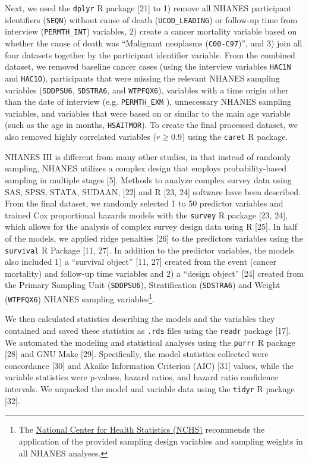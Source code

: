 \documentclass[12pt,oneside]{reedthesis}
\theoremstyle{definition}
\theoremstyle{definition}
\theoremstyle{definition}
\theoremstyle{remark}
\begin{document}
Next, we used the \texttt{dplyr} R package {[}21{]} to 1) remove all
NHANES participant identifiers (\texttt{SEQN}) without cause of death
(\texttt{UCOD\_LEADING}) or follow-up time from interview
(\texttt{PERMTH\_INT}) variables, 2) create a cancer mortality variable
based on whether the cause of death was ``Malignant neoplasms
(\texttt{C00-C97})'', and 3) join all four datasets together by the
participant identifier variable. From the combined dataset, we removed
baseline cancer cases (using the interview variables \texttt{HAC1N} and
\texttt{HAC1O}), participants that were missing the relevant NHANES
sampling variables (\texttt{SDDPSU6}, \texttt{SDSTRA6}, and
\texttt{WTPFQX6}), variables with a time origin other than the date of
interview (e.g. \texttt{PERMTH\_EXM} ), unnecessary NHANES sampling
variables, and variables that were based on or similar to the main age
variable (such as the age in months, \texttt{HSAITMOR}). To create the
final processed dataset, we also removed highly correlated variables
(\(r \geq 0.9\)) using the \texttt{caret} R package.

NHANES III is different from many other studies, in that instead of
randomly sampling, NHANES utilizes a complex design that employs
probability-based sampling in multiple stages {[}5{]}. Methods to
analyze complex survey data using SAS, SPSS, STATA, SUDAAN, {[}22{]} and
R {[}23, 24{]} software have been described. From the final dataset, we
randomly selected 1 to 50 predictor variables and trained Cox
proportional hazards models with the \texttt{survey} R package {[}23,
24{]}, which allows for the analysis of complex survey design data using
R {[}25{]}. In half of the models, we applied ridge penalties {[}26{]}
to the predictors variables using the \texttt{survival} R Package {[}11,
27{]}. In addition to the predictor variables, the models also included
1) a ``survival object'' {[}11, 27{]} created from the event (cancer
mortality) and follow-up time variables and 2) a ``design object''
{[}24{]} created from the Primary Sampling Unit (\texttt{SDDPSU6}),
Stratification (\texttt{SDSTRA6}) and Weight (\texttt{WTPFQX6}) NHANES
sampling variables\footnote{The
  \href{https://www.cdc.gov/nchs/tutorials/NHANES/SurveyDesign/SampleDesign/intro_iii.htm}{National
  Center for Health Statistics (NCHS)} recommends the application of the
  provided sampling design variables and sampling weights in all NHANES
  analyses.}.

We then calculated statistics describing the models and the variables
they contained and saved these statistics as \texttt{.rds} files using
the \texttt{readr} package {[}17{]}. We automated the modeling and
statistical analyses using the \texttt{purrr} R package {[}28{]} and GNU
Make {[}29{]}. Specifically, the model statistics collected were
concordance {[}30{]} and Akaike Information Criterion (AIC) {[}31{]}
values, while the variable statistics were p-values, hazard ratios, and
hazard ratio confidence intervals. We unpacked the model and variable
data using the \texttt{tidyr} R package {[}32{]}.
\end{document}
